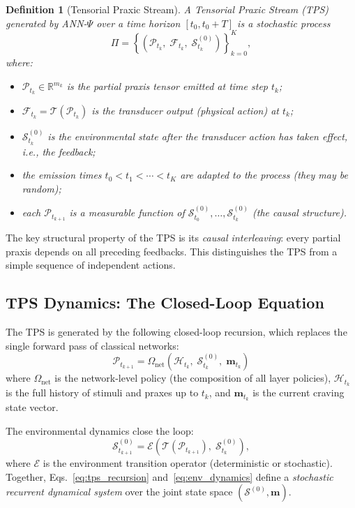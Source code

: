 \documentclass[12pt,a4paper]{article}
\newtheorem{definition}{Definition}
\newcommand{\tens}[1]{\boldsymbol{\mathcal{#1}}}
\newcommand{\R}{\mathbb{R}}
\begin{document}
\begin{definition}[Tensorial Praxic Stream]
\label{def:tps}
A \emph{Tensorial Praxic Stream} (TPS) generated by ANN-$\Psi$ over a
time horizon $[t_0, t_0 + T]$ is a stochastic process
\[
\Pi = \left\{
\left(\tens{P}_{t_k},\; \tens{F}_{t_k},\; \tens{S}_{t_k}^{(0)}\right)
\right\}_{k=0}^{K},
\]
where:
\begin{itemize}
\item $\tens{P}_{t_k} \in \R^{m_k}$ is the \emph{partial praxis tensor}
emitted at time step $t_k$;
\item $\tens{F}_{t_k} = \mathcal{T}(\tens{P}_{t_k})$ is the transducer output
(physical action) at $t_k$;
\item $\tens{S}_{t_k}^{(0)}$ is the environmental state \emph{after} the
transducer action has taken effect, i.e., the feedback;
\item the emission times $t_0 < t_1 < \cdots < t_K$ are adapted to the process
(they may be random);
\item each $\tens{P}_{t_{k+1}}$ is a measurable function of
$\tens{S}_{t_0}^{(0)}, \ldots, \tens{S}_{t_k}^{(0)}$ (the causal structure).
\end{itemize}
\end{definition}

The key structural property of the TPS is its \textit{causal interleaving}: every
partial praxis depends on all preceding feedbacks. This distinguishes the TPS from
a simple sequence of independent actions.

\subsection{TPS Dynamics: The Closed-Loop Equation}

The TPS is generated by the following closed-loop recursion, which replaces the
single forward pass of classical networks:
\begin{equation}
\boxed{
\tens{P}_{t_{k+1}} = \Omega_{\text{net}}\!\left(
\mathcal{H}_{t_k},\;
\tens{S}_{t_k}^{(0)},\;
\mathbf{m}_{t_k}
\right)
}
\label{eq:tps_recursion}
\end{equation}
where $\Omega_{\text{net}}$ is the network-level policy (the composition of all
layer policies), $\mathcal{H}_{t_k}$ is the full history of stimuli and praxes
up to $t_k$, and $\mathbf{m}_{t_k}$ is the current craving state vector.

The environmental dynamics close the loop:
\begin{equation}
\tens{S}_{t_{k+1}}^{(0)} = \mathcal{E}\!\left(
\mathcal{T}(\tens{P}_{t_{k+1}}),\; \tens{S}_{t_k}^{(0)}
\right),
\label{eq:env_dynamics}
\end{equation}
where $\mathcal{E}$ is the environment transition operator (deterministic or
stochastic). Together, Eqs.~\eqref{eq:tps_recursion} and~\eqref{eq:env_dynamics}
define a \textit{stochastic recurrent dynamical system} over the joint state space
$(\tens{S}^{(0)}, \mathbf{m})$.
\end{document}
